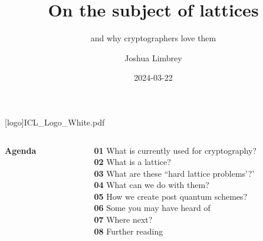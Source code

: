 \documentclass[
aspectratio=169, %
t, %
onlytextwidth, %
10pt, %
]{beamer}
\title{On the subject of lattices} %
\subtitle{and why cryptographers love them} %
\author{Joshua Limbrey} %
\date{2024-03-22} %
\begin{document}




\begingroup
{} %
[logo]{ICL_Logo_White.pdf} %
\frame[plain, s]{\titlepage} %
\endgroup



\begingroup
{} %

\begin{frame}
    \begin{columns}[T] %
        \begin{column}{0.48\linewidth} %
            \HUGE\textbf{Agenda}
        \end{column}
        \begin{column}{0.48\linewidth} %
            \textbf{01} What is currently used for cryptography?\\ %
            \textbf{02} What is a lattice?\\
            \textbf{03} What are these ``hard lattice problems'?'\\
            \textbf{04} What can we do with them?\\
            \textbf{05} How we create post quantum schemes?\\
            \textbf{06} Some you may have heard of\\
            \textbf{07} Where next?\\
            \textbf{08} Further reading

        \end{column}
    \end{columns}
\end{frame}
\endgroup
\end{document}

